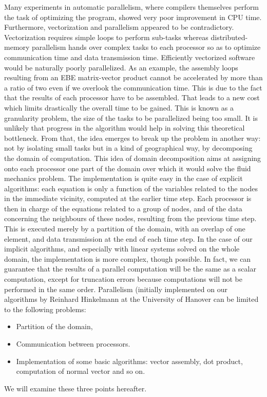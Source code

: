 Many experiments in automatic parallelism, where compilers themselves perform
the task of optimizing the program, showed very poor improvement in CPU time.
Furthermore, vectorization and parallelism appeared to be contradictory.
Vectorization requires simple loops to perform sub-tasks whereas
distributed-memory parallelism hands over complex tasks to each processor so as
to optimize communication time and data transmission time. Efficiently
vectorized software would be naturally poorly parallelized. As an example, the
assembly loops resulting from an EBE matrix-vector product cannot be
accelerated by more than a ratio of two even if we overlook the communication
time. This is due to the fact that the results of each processor have to be
assembled. That leads to a new cost which limits drastically the overall time
to be gained. This is known as a granularity problem, the size of the tasks to
be parallelized being too small. It is unlikely that progress in the algorithm
would help in solving this theoretical bottleneck. From that, the idea emerges
to break up the problem in another way: not by isolating small tasks but in a
kind of geographical way, by decomposing the domain of computation. This idea
of domain decomposition aims at assigning onto each processor one part of the
domain over which it would solve the fluid mechanics problem. The
implementation is quite easy in the case of explicit algorithms: each equation
is only a function of the variables related to the nodes in the immediate
vicinity, computed at the earlier time step. Each processor is then in charge
of the equations related to a group of nodes, and of the data concerning the
neighbours of these nodes, resulting from the previous time step. This is
executed merely by a partition of the domain, with an overlap of one element,
and data transmission at the end of each time step. In the case of our implicit
algorithms, and especially with linear systems solved on the whole domain, the
implementation is more complex, though possible. In fact, we can guarantee that
the results of a parallel computation will be the same as a scalar computation,
except for truncation errors because computations will not be performed in the
same order. Parallelism (initially implemented on our algorithms by Reinhard
Hinkelmann at the University of Hanover can be limited to the following
problems:
\begin{itemize}
  \item Partition of the domain,
  \item Communication between processors.
  \item Implementation of some basic algorithms: vector assembly, dot product,
    computation of normal vector and so on.
\end{itemize}
We will examine these three points hereafter.

